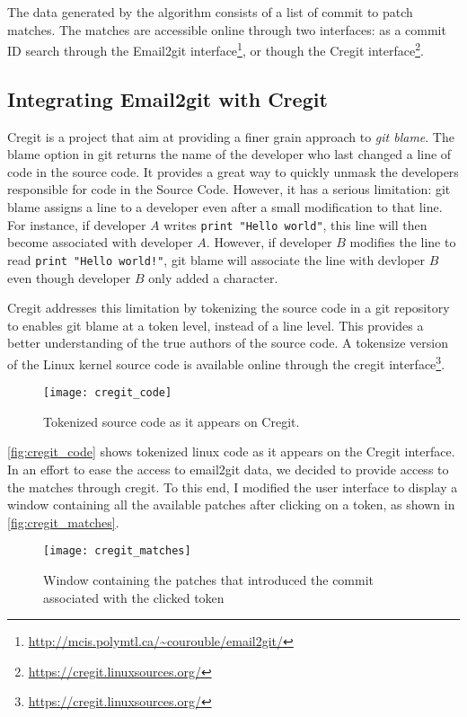 The data generated by the algorithm consists of a list of commit to patch matches. The matches are accessible online through two interfaces: as a commit ID search through the Email2git interface\footnote{\url{http://mcis.polymtl.ca/~courouble/email2git/}}, or though the Cregit interface\footnote{\url{https://cregit.linuxsources.org/}}.



\subsection{Integrating Email2git with Cregit}

Cregit is a project that aim at providing a finer grain approach to \textit{git blame}. The blame option in git returns the name of the developer who last changed a line of code in the source code. It provides a great way to quickly unmask the developers responsible for code in the Source Code. However, it has a serious limitation: git blame assigns a line to a developer even after a small modification to that line. For instance, if developer $A$ writes \texttt{print "Hello world"}, this line will then become associated with developer $A$. However, if developer $B$ modifies the line to read \texttt{print "Hello world!"}, git blame will associate the line with devloper $B$ even though developer $B$ only added a character. 

Cregit addresses this limitation by tokenizing the source code in a git repository to enables git blame at a token level, instead of a line level. This provides a better understanding of the true authors of the source code. A tokensize version of the Linux kernel source code is available online through the cregit interface\footnote{\url{https://cregit.linuxsources.org/}}.

\begin{figure}[htb]
\centering
\texttt{[image: cregit\_code]}
\caption{Tokenized source code as it appears on Cregit.}
\label{fig:cregit_code}
\end{figure}

\autoref{fig:cregit_code} shows tokenized linux code as it appears on the Cregit interface. In an effort to ease the access to email2git data, we decided to provide access to the matches through cregit. To this end, I modified the user interface to display a window containing all the available patches after clicking on a token, as shown in \autoref{fig:cregit_matches}. 

\begin{figure}[htb]
\centering
\texttt{[image: cregit\_matches]}
\caption{Window containing the patches that introduced the commit associated with the clicked token}
\label{fig:cregit_matches}
\end{figure}







